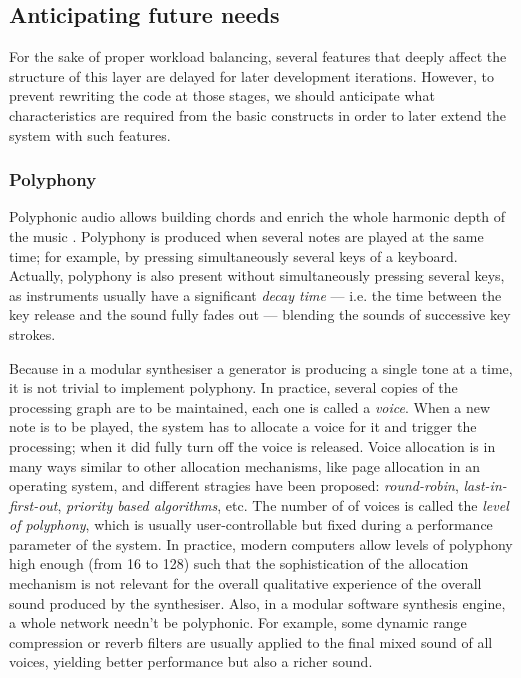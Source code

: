 \subsection{Anticipating future needs}

For the sake of proper workload balancing, several features that
deeply affect the structure of this layer are delayed for later
development iterations. However, to prevent rewriting the code at
those stages, we should anticipate what characteristics are
required from the basic constructs in order to later extend the system
with such features.

\subsubsection{Polyphony}

Polyphonic audio allows building chords and enrich the whole harmonic
depth of the music \cite{johnson02measured}. Polyphony is produced
when several notes are played at the same time; for example, by
pressing simultaneously several keys of a keyboard. Actually,
polyphony is also present without simultaneously pressing several
keys, as instruments usually have a significant \emph{decay time} ---
i.e. the time between the key release and the sound fully fades out
--- blending the sounds of successive key strokes.

Because in a modular synthesiser a generator is producing a single
tone at a time, it is not trivial to implement polyphony. In practice,
several copies of the processing graph are to be maintained, each one
is called a \emph{voice}. When a new note is to be played, the system
has to allocate a voice for it and trigger the processing; when it did
fully turn off the voice is released. Voice allocation is in many ways
similar to other allocation mechanisms, like page allocation in an
operating system, and different stragies have been proposed:
\emph{round-robin}, \emph{last-in-first-out}, \emph{priority based
  algorithms}, etc. The number of of voices is called the \emph{level
  of polyphony}, which is usually user-controllable but fixed during a
performance parameter of the system. In practice, modern computers
allow levels of polyphony high enough (from 16 to 128) such that the
sophistication of the allocation mechanism is not relevant for the
overall qualitative experience of the overall sound produced by the
synthesiser. Also, in a modular software synthesis engine, a whole
network needn't be polyphonic. For example, some dynamic range
compression or reverb filters are usually applied to the final mixed
sound of all voices, yielding better performance but also a richer
sound.

